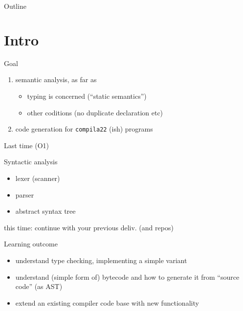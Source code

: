 \documentclass{beamer}
\date{\today}
\title{}
\begin{document}
\begin{frame}{Outline}
\tableofcontents
\end{frame}

\chapter{Intro}
\label{sec:org30d38ea}
\begin{frame}[label={sec:orgece807b},fragile]{Goal}
 \begin{enumerate}
\item \alert{semantic  analysis}, as far as 
\begin{itemize}
\item \alert{typing} is concerned (``static semantics'')
\item other coditions (no duplicate declaration etc)
\end{itemize}

\item \alert{code generation} for \texttt{compila22} (ish) programs
\end{enumerate}
\end{frame}






\begin{frame}[label={sec:org8f7d745}]{Last time (O1)}
\begin{block}{Syntactic analysis}
\begin{itemize}
\item lexer (scanner)
\item parser
\item abstract syntax tree
\end{itemize}
\end{block}



\alert{this time}: continue with your previous deliv. (and repos)
\end{frame}



\begin{frame}[label={sec:org4561e89}]{Learning outcome}
\begin{itemize}
\item understand type checking, implementing a simple variant
\end{itemize}


\begin{itemize}
\item understand (simple form of) bytecode and how to generate it from ``source
code'' (as AST)

\item extend an existing compiler code base with new functionality
\end{itemize}
\end{frame}
\end{document}
